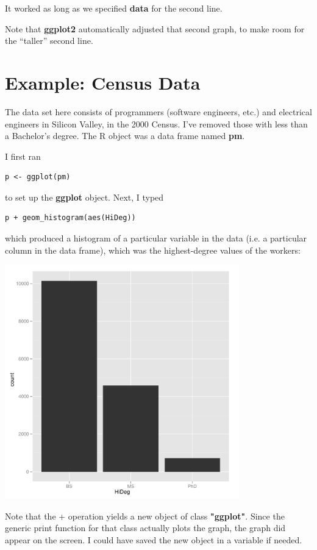 It worked as long as we specified {\bf data} for the second line.

Note that {\bf ggplot2} automatically adjusted that second graph, to
make room for the ``taller'' second line.

\section{Example:  Census Data}

The data set here consists of programmers (software engineers, etc.) and
electrical engineers in Silicon Valley, in the 2000 Census.  I've
removed those with less than a Bachelor's degree.  The R object was a
data frame named {\bf pm}.

I first ran

\begin{lstlisting}
p <- ggplot(pm)
\end{lstlisting}

to set up the {\bf ggplot} object.  Next, I typed

\begin{lstlisting}
p + geom_histogram(aes(HiDeg))
\end{lstlisting}

which produced a histogram of a particular variable in the data (i.e. a
particular column in the data frame), which was the highest-degree
values of the workers:

\includegraphics[bb=0 0 504 504,width=4.0in]{EdHist.pdf}

Note that the + operation yields a new object of class {\bf "ggplot"}.
Since the generic print function for that class actually plots the
graph, the graph did appear on the screen.  I could have saved the new
object in a variable if needed.

